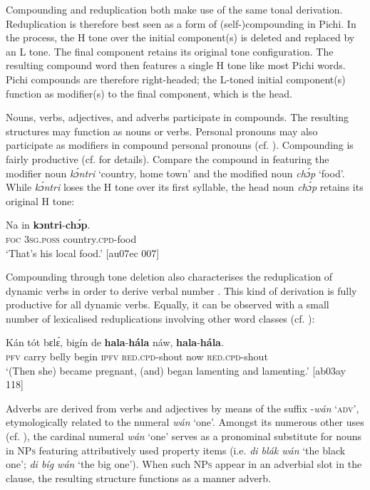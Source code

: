 Compounding and reduplication both make use of the same tonal derivation. Reduplication is therefore best seen as a form of (self-)compounding in Pichi. In the process, the H tone over the initial component(s) is deleted and replaced by an L tone. The final component retains its original tone configuration. The resulting compound word then features a single H tone like most Pichi words. Pichi compounds are therefore right-headed; the L-toned initial component(s) function as modifier(s) to the final component, which is the head. 


Nouns, verbs, adjectives, and adverbs participate in compounds. The resulting structures may function as nouns or verbs. Personal pronouns may also participate as modifiers in compound personal pronouns (cf. ). Compounding is fairly productive (cf.  for details). Compare the compound in  featuring the modifier noun \textit{kɔ́ntri} ‘country, home town’ and the modified noun \textit{chɔ́p} ‘food’. While \textit{kɔ́ntri} loses the H tone over its first syllable, the head noun \textit{chɔ́p} retains its original H tone:



\ea%
    \label{ex:key:99}
    \gll   Na  in    \textbf{kɔntri}{}-\textbf{chɔ́p}.\\
\textsc{foc}  \textsc{3sg.poss}  country.\textsc{cpd}{}-food\\

\glt ‘That’s his local food.’ [au07ec 007]
\z

Compounding through tone deletion also characterises the reduplication of dynamic verbs in order to derive verbal number . This kind of derivation is fully productive for all dynamic verbs. Equally, it can be observed with a small number of lexicalised reduplications involving other word classes (cf. ):


\ea%
    \label{ex:key:100}
    \gll Kán  tót    bɛlɛ́,    bigín  de  \textbf{hala}-\textbf{hála}  náw,  \textbf{hala}-\textbf{hála}.\\
\textsc{pfv}  carry  belly  begin  \textsc{ipfv}  \textsc{red.cpd-}shout  now    \textsc{red.cpd-}shout\\

\glt ‘(Then she) became pregnant, (and) began lamenting and lamenting.’ [ab03ay 118]
\z

Adverbs are derived from verbs and adjectives by means of the suffix -\textit{wán} \textsc{‘adv’}, etymologically related to the numeral \textit{wán} ‘one’. Amongst its numerous other uses (cf. ), the cardinal numeral \textit{wán} ‘one’ serves as a pronominal substitute for nouns in \textsc{NPs} featuring attributively used property items (i.e. \textit{di blák wán} ‘the black one’; \textit{di bíg wán} ‘the big one’). When such \textsc{NPs} appear in an adverbial slot in the clause, the resulting structure functions as a manner adverb. 


